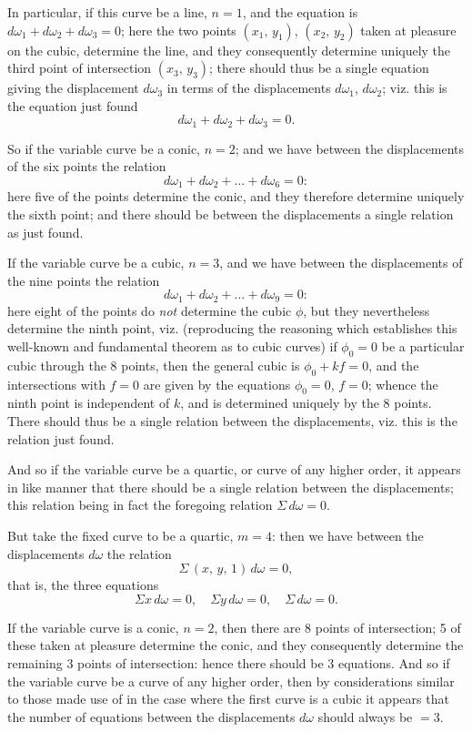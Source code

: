 \documentclass[11pt,a4paper]{book}
\begin{document}
In particular, if this curve be a line, $n=1$, and the equation is $d\omega_1 + d\omega_2 + d\omega_3 = 0$; here the two points $(x_1,\,y_1)$, $(x_2,\,y_2)$ taken at pleasure on the cubic, determine the line, and they consequently determine uniquely the third point of intersection $(x_3,\,y_3)$; there should thus be a single equation giving the displacement $d\omega_3$ in terms of the displacements $d\omega_1$, $d\omega_2$; viz. this is the equation just found
\[
d\omega_1 + d\omega_2 + d\omega_3 = 0.
\]

So if the variable curve be a conic, $n=2$; and we have between the displacements of the six points the relation
\[
d\omega_1 + d\omega_2 + \ldots + d\omega_6 = 0:
\]
here five of the points determine the conic, and they therefore determine uniquely the sixth point; and there should be between the displacements a single relation as just found.

If the variable curve be a cubic, $n=3$, and we have between the displacements of the nine points the relation
\[
d\omega_1 + d\omega_2 + \ldots + d\omega_9 = 0:
\]
here eight of the points do \emph{not} determine the cubic $\phi$, but they nevertheless determine the ninth point, viz. (reproducing the reasoning which establishes this well-known and fundamental theorem as to cubic curves) if $\phi_0 = 0$ be a particular cubic through the 8 points, then the general cubic is $\phi_0 + kf = 0$, and the intersections with $f=0$ are given by the equations $\phi_0=0$, $f=0$; whence the ninth point is independent of $k$, and is determined uniquely by the 8 points. There should thus be a single relation between the displacements, viz. this is the relation just found.

And so if the variable curve be a quartic, or curve of any higher order, it appears in like manner that there should be a single relation between the displacements; this relation being in fact the foregoing relation $\Sigma\,d\omega = 0$.

But take the fixed curve to be a quartic, $m=4$: then we have between the displacements $d\omega$ the relation
\[
\Sigma\,(x,\,y,\,1)\,d\omega = 0,
\]
that is, the three equations
\[
\Sigma x\,d\omega = 0,\quad \Sigma y\,d\omega = 0,\quad \Sigma\,d\omega = 0.
\]

If the variable curve is a conic, $n=2$, then there are 8 points of intersection; 5 of these taken at pleasure determine the conic, and they consequently determine the remaining 3 points of intersection: hence there should be 3 equations. And so if the variable curve be a curve of any higher order, then by considerations similar to those made use of in the case where the first curve is a cubic it appears that the number of equations between the displacements $d\omega$ should always be $=3$.
\end{document}
